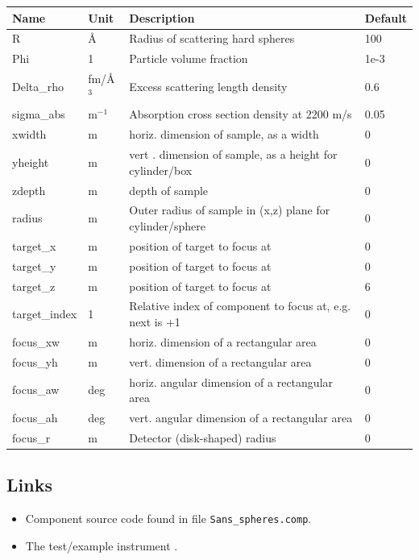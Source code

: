 \begin{longtable}{p{}p{}p{}p{}}
\toprule
\textbf{Name} & \textbf{Unit} & \textbf{Description} & \textbf{Default} \\
\midrule
\endhead
R & \AA{} & Radius of scattering hard spheres & 100 \\
Phi & 1 & Particle volume fraction & 1e-3 \\
Delta\_rho & fm/\AA{}$^{3}$ & Excess scattering length density & 0.6 \\
sigma\_abs & m$^{-1}$ & Absorption cross section density at 2200 m/s & 0.05 \\
xwidth & m & horiz. dimension of sample, as a width & 0 \\
yheight & m & vert . dimension of sample, as a height for cylinder/box & 0 \\
zdepth & m & depth of sample & 0 \\
radius & m & Outer radius of sample in (x,z) plane for cylinder/sphere & 0 \\
target\_x & m & position of target to focus at & 0 \\
target\_y & m & position of target to focus at & 0 \\
target\_z & m & position of target to focus at & 6 \\
target\_index & 1 & Relative index of component to focus at, e.g. next is +1 & 0 \\
focus\_xw & m & horiz. dimension of a rectangular area & 0 \\
focus\_yh & m & vert.  dimension of a rectangular area & 0 \\
focus\_aw & deg & horiz. angular dimension of a rectangular area & 0 \\
focus\_ah & deg & vert.  angular dimension of a rectangular area & 0 \\
focus\_r & m & Detector (disk-shaped) radius & 0 \\
\bottomrule
\end{longtable}

\subsection*{Links}
\begin{itemize}
  \item Component source code found in file \texttt{Sans\_spheres.comp}.
  \item The test/example instrument .
\end{itemize}
